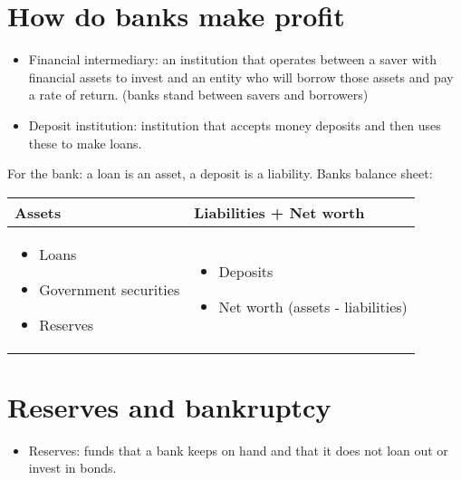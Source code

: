 \documentclass[openany]{book}
\begin{document}
\section{How do banks make profit}
\begin{itemize}
    \item Financial intermediary: an institution that operates between a saver with financial assets to invest and an entity who will borrow those assets and pay a rate of return. (banks stand between savers and borrowers)
    \item Deposit institution: institution that accepts money deposits and then uses these to make loans.
\end{itemize}
For the bank: a loan is an asset, a deposit is a liability. Banks balance sheet: 
\begin{center}
    \begin{tabular}{ |p{6cm}|p{6cm}| }
        \hline
            Assets & Liabilities + Net worth  \\
        \hline
            \begin{itemize}
                \item Loans 
                \item Government securities 
                \item Reserves 
            \end{itemize}
            & 
            \begin{itemize}
                \item Deposits 
                \item Net worth (assets - liabilities)
            \end{itemize}
            \\ 
        \hline
    \end{tabular}
\end{center}

\section{Reserves and bankruptcy}
\begin{itemize}
    \item Reserves: funds that a bank keeps on hand and that it does not loan out or invest in bonds.
\end{itemize}
\end{document}
